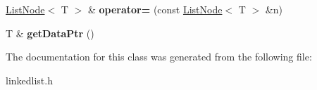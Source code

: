 \begin{DoxyCompactItemize}
\item 
\hyperlink{classListNode}{List\+Node}$<$ T $>$ \& {\bfseries operator=} (const \hyperlink{classListNode}{List\+Node}$<$ T $>$ \&n)\hypertarget{classListNode_a637f1c11198cd3e67b9ad061af50e632}{}\label{classListNode_a637f1c11198cd3e67b9ad061af50e632}

\item 
T \& {\bfseries get\+Data\+Ptr} ()\hypertarget{classListNode_a3969a0c83dfe22fd276d0eff8fd0f75b}{}\label{classListNode_a3969a0c83dfe22fd276d0eff8fd0f75b}

\end{DoxyCompactItemize}


The documentation for this class was generated from the following file\+:\begin{DoxyCompactItemize}
\item 
linkedlist.\+h\end{DoxyCompactItemize}
